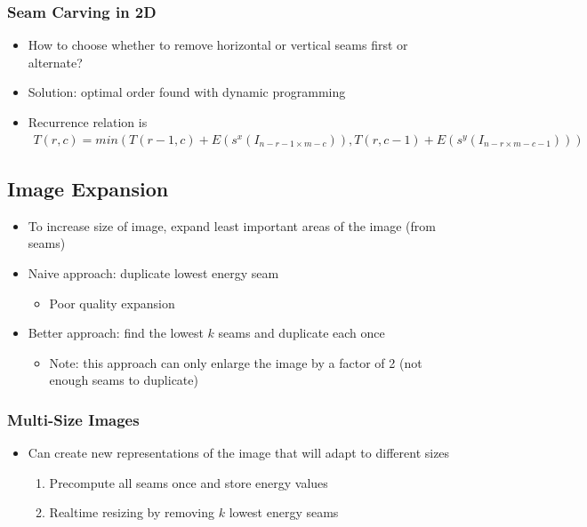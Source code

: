 \documentclass[letterpaper,12pt]{article}
\begin{document}
\subsubsection{Seam Carving in 2D}
\begin{itemize}
 \item How to choose whether to remove horizontal or vertical seams first or alternate?
 \item Solution: optimal order found with dynamic programming
 \item Recurrence relation is
       \begin{align}
        T(r,c)=min(T(r-1,c)+E(s^x(I_{n-r-1\times m-c})),T(r,c-1)+E(s^y(I_{n-r\times m-c-1})))
       \end{align}
\end{itemize}

\subsection{Image Expansion}
\begin{itemize}
 \item To increase size of image, expand least important areas of the image (from seams)
 \item Naive approach: duplicate lowest energy seam
       \begin{itemize}
        \item Poor quality expansion
       \end{itemize}
 \item Better approach: find the lowest $k$ seams and duplicate each once
       \begin{itemize}
        \item Note: this approach can only enlarge the image by a factor of 2 (not enough seams to duplicate)
       \end{itemize}
\end{itemize}

\subsubsection{Multi-Size Images}
\begin{itemize}
 \item Can create new representations of the image that will adapt to different sizes
       \begin{enumerate}
        \item Precompute all seams once and store energy values
        \item Realtime resizing by removing $k$ lowest energy seams
       \end{enumerate}
\end{itemize}
\end{document}
